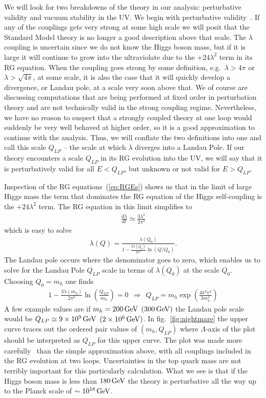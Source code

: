 \documentclass[12pt]{article}
\def\beq{\begin{eqnarray}}
\def\eeq{\end{eqnarray}}
\def\gev{\, {\rm GeV}}
\begin{document}
We will look for two breakdowns of the theory in our analysis: perturbative validity and vacuum stability in the UV. We begin with perturbative validity~\cite{Cabibbo:1979ay}. If any of the couplings gets very strong at some high scale we will posit that the Standard Model theory is no longer a good description above that scale. The $\lambda$ coupling is uncertain since we do not know the Higgs boson mass, but if it is large it will continue to grow into the ultraviolate due to the $+24\lambda^2$ term in its RG equation. When the  coupling goes strong by some definition, e.g.\ $\lambda>4\pi$ or $\lambda>\sqrt{4\pi}$, at some scale, it is also the case that it will quickly develop a divergence, or Landau pole, at a scale very soon above that. We of course are discussing computations that are being performed at fixed order in perturbation theory and are not technically valid in the strong coupling regime. Nevertheless, we have no reason to suspect that a strongly coupled theory at one loop would suddenly be very well behaved at higher order, so it is a good approximation to continue with the analysis.  Thus, we will conflate the two definitions into one and call this scale $Q_{LP}$ -- the scale at which $\lambda$ diverges into a Landau Pole.  If our theory encounters a scale $Q_{LP}$ in its RG evolution into the UV, we will say that it is perturbatively valid for all $E<Q_{LP}$, but unknown or not valid for $E>Q_{LP}$.

Inspection of the RG equations~(\ref{eq:RGEs}) shows us that in the limit of large Higgs mass the term that dominates the RG equation of the Higgs self-coupling is the $+24\lambda^2$ term.  The RG equation in this limit simplifies to 
\beq
\frac{d\lambda}{dt}\simeq \frac{3\lambda^2}{2\pi^2}
\eeq
which is easy to solve
\beq
\lambda(Q)=\frac{\lambda(Q_0)}{1-\frac{3\lambda(Q_0)}{2\pi^2}\ln(Q/Q_0)}.
\eeq
The Landau pole occurs where the denominator goes to zero, which enables us to solve for the Landau Pole $Q_{LP}$ scale in terms of $\lambda(Q_0)$ at the scale $Q_0$. Choosing $Q_0=m_h$ one finds
\beq
1-\frac{3\lambda(m_h)}{2\pi^2}\ln\left(\frac{Q_{LP}}{m_h}\right)=0~~\Longrightarrow~~
Q_{LP}=m_h\exp \left( \frac{4\pi^2v^2}{3m_h^2}\right)
\eeq
A few example values are if $m_h=200\gev$ $(300\gev)$ the Landau pole scale would be
$Q_{LP}\simeq 9\times 10^9\gev$ $(2\times 10^6\gev)$.  In fig.~\ref{fig:nightmare} the upper curve traces out the ordered pair values of $(m_h,Q_{LP})$ where $\Lambda$-axis of the plot should be interpreted as $Q_{LP}$ for this upper curve.  The plot was made more carefully~\cite{Tobe:2002zj} than the simple approximation above, with all couplings included in the RG evolution at two loops.  Uncertainties in the top quark mass are not terribly important for this particularly calculation. What we see is that if the Higgs boson mass is less than $180\gev$ the theory is perturbative all the way up to the Planck scale of $\sim 10^{18}\gev$.
\end{document}
